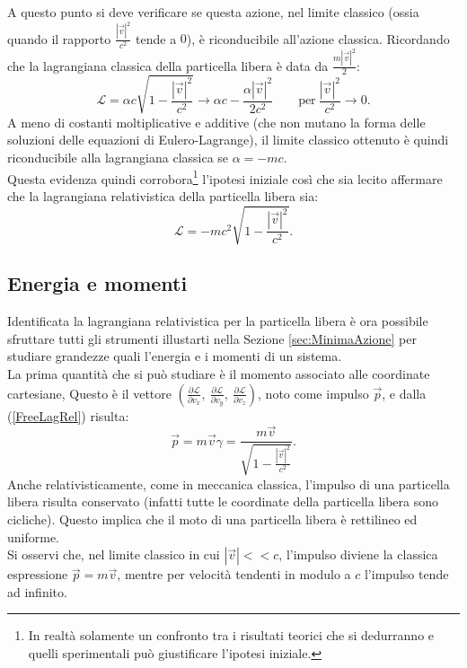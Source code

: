 A questo punto si deve verificare se questa azione, nel limite classico (ossia quando il rapporto $\frac{|\vec{v}|^2}{c^2}$ tende a $0$), è riconducibile all'azione classica. Ricordando che la lagrangiana classica della particella libera è data da $\frac{m|\vec{v}|^2}{2} $:
\begin{equation*}
    \mathcal{L} =\alpha c \sqrt{1-\frac{|\vec{v}|^2}{c^2}}\longrightarrow \alpha c - \frac{\alpha |\vec{v}|^2}{2c^2}\qquad \text{per}\ \frac{|\vec{v}|^2}{c^2}\rightarrow 0.
\end{equation*}
A meno di costanti moltiplicative e additive (che non mutano la forma delle soluzioni delle equazioni di Eulero-Lagrange), il limite classico ottenuto è quindi riconducibile alla lagrangiana classica se $\alpha=-mc$.\\
Questa evidenza quindi corrobora\footnote{In realtà solamente un confronto tra i risultati teorici che si dedurranno e quelli sperimentali può giustificare l'ipotesi iniziale.} l'ipotesi iniziale così che sia lecito affermare che la lagrangiana relativistica della particella libera sia:
\begin{equation}\label{FreeLagRel}
    \mathcal{L} = -mc^2\sqrt{1-\frac{|\vec{v}|^2}{c^2}}.
\end{equation}
\subsection{Energia e momenti}\label{sec:LagRelEnMo}
Identificata la lagrangiana relativistica per la particella libera è ora possibile sfruttare tutti gli strumenti illustarti nella Sezione \ref{sec:MinimaAzione} per studiare grandezze quali l'energia e i momenti di un sistema.\\

La prima quantità che si può studiare è il momento associato alle coordinate cartesiane, Questo è il vettore  $(\frac{\partial \mathcal{L} }{\partial v_x},\ \frac{\partial \mathcal{L} }{\partial v_y},\ \frac{\partial \mathcal{L} }{\partial v_z})$, noto come impulso $\vec p$, e dalla (\ref{FreeLagRel}) risulta:
\begin{equation}
    \vec{p}=m\vec{v}\gamma=\frac{m\vec{v}}{\sqrt{1-\frac{|\vec{v}|^2}{c^2}}}.
    \label{impulsoRel}
\end{equation}
Anche relativisticamente, come in meccanica classica, l'impulso di una particella libera risulta conservato (infatti tutte le coordinate della particella libera sono cicliche). Questo implica che il moto di una particella libera è rettilineo ed uniforme.\\
Si osservi che, nel limite classico in cui $|\vec{v}|<<c$, l'impulso diviene la classica espressione $\vec p=m\vec v$, mentre per velocità tendenti in modulo a $c$ l'impulso tende ad infinito.\\

